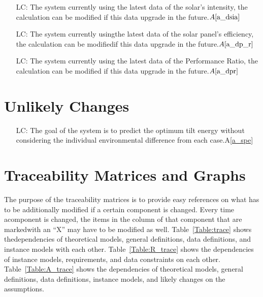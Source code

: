 \documentclass[12pt]{article}
\newcommand{\aref}[1]{A\ref{#1}}
\newcounter{lcnum} %
\begin{document}
\noindent \begin{itemize}

\item[LC\refstepcounter{lcnum}\thelcnum\label{LC_SI}:] The system currently
using the latest data of the solar's intensity, the calculation can be modified
if this data upgrade in the future.$\aref{a_dsia}$

\item[LC\refstepcounter{lcnum}\thelcnum\label{LC_P}:] The system currently
usingthe latest data of the solar panel's efficiency, the calculation can be
modifiedif this data upgrade in the future.$\aref{a_dp_r}$

\item[LC\refstepcounter{lcnum}\thelcnum\label{LC_Pr}:] The system currently
using the latest data of the Performance Ratio, the calculation can be modified
if this data upgrade in the future.$\aref{a_dpr}$


\end{itemize}

\section{Unlikely Changes}    

\noindent \begin{itemize}

\item[LC\refstepcounter{lcnum}\thelcnum\label{LC_G}:] The goal of the system is
to predict the optimum tilt energy without considering the individual
environmental difference from each case.\aref{a_spe}


\end{itemize}

\section{Traceability Matrices and Graphs}

The purpose of the traceability matrices is to provide easy references on what
has to be additionally modified if a certain component is changed. Every time
acomponent is changed, the items in the column of that component that are
markedwith an ``X'' may have to be modified as well. Table~\ref{Table:trace}
shows
thedependencies of theoretical models, general definitions, data definitions,
and
instance models with each other. Table~\ref{Table:R_trace} shows the
dependencies of instance models, requirements, and data constraints on each
other. Table~\ref{Table:A_trace} shows the dependencies of theoretical models,
general definitions, data definitions, instance models, and likely changes on
the assumptions.\\
\end{document}
